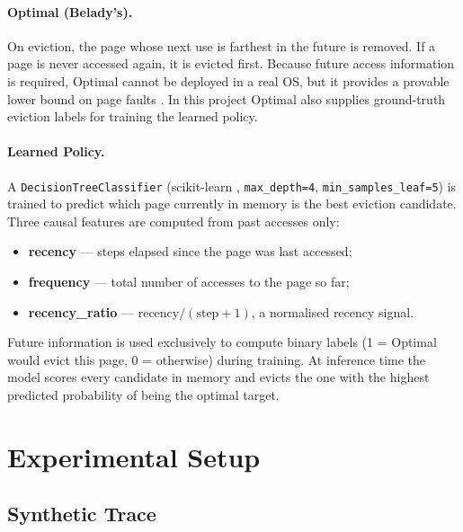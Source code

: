 \documentclass[12pt,a4paper]{article}
\begin{document}
\paragraph{Optimal (Belady's).} On eviction, the page whose next use is
farthest in the future is removed. If a page is never accessed again, it is
evicted first. Because future access information is required, Optimal cannot
be deployed in a real OS, but it provides a provable lower bound on page faults
\cite{belady1966}. In this project Optimal also supplies ground-truth eviction
labels for training the learned policy.

\paragraph{Learned Policy.} A \texttt{DecisionTreeClassifier} (scikit-learn
\cite{pedregosa2011}, \texttt{max\_depth=4}, \texttt{min\_samples\_leaf=5}) is
trained to predict which page currently in memory is the best eviction
candidate. Three causal features are computed from past accesses only:

\begin{itemize}
  \item \textbf{recency} --- steps elapsed since the page was last accessed;
  \item \textbf{frequency} --- total number of accesses to the page so far;
  \item \textbf{recency\_ratio} --- \(\text{recency} / (\text{step} + 1)\),
        a normalised recency signal.
\end{itemize}

Future information is used exclusively to compute binary labels
(1 = Optimal would evict this page, 0 = otherwise) during training.
At inference time the model scores every candidate in memory and evicts the
one with the highest predicted probability of being the optimal target.

\section{Experimental Setup}

\subsection{Synthetic Trace}
\end{document}
